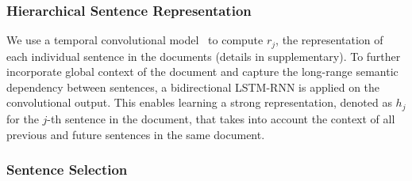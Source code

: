 \documentclass[11pt,a4paper]{article}
\begin{document}
\subsubsection{Hierarchical Sentence Representation}
\label{sec:sent-rep}
We use a temporal convolutional model~\cite{kim:2014:EMNLP2014} to compute $r_j$, the representation of 
each individual sentence in the documents (details in supplementary). 
To further incorporate global context of the document and capture the long-range semantic dependency between sentences, 
a bidirectional LSTM-RNN \citep{Hochreiter:1997:LSM:265493.264179,Schuster97bidirectionalrecurrent}
is applied on the convolutional output.
This enables learning a strong representation,
denoted as $h_j$ for the $j$-th sentence in the document, that takes into account the context of all previous and future sentences in the same document.

\subsubsection{Sentence Selection}\label{subsec:sent_select}
\end{document}
